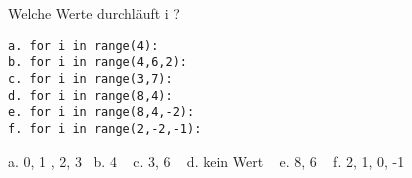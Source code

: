 \question[3] Welche Werte durchläuft i ?
\begin{lstlisting}
a. for i in range(4):
b. for i in range(4,6,2):
c. for i in range(3,7):
d. for i in range(8,4):
e. for i in range(8,4,-2):
f. for i in range(2,-2,-1):
\end{lstlisting}
\begin{solutionbox}{3cm}
a. 0, 1 , 2, 3 ~b. 4 ~ c. 3, 6 ~ d. kein Wert  ~ e. 8, 6 ~ f. 2, 1, 0, -1
\end{solutionbox}
